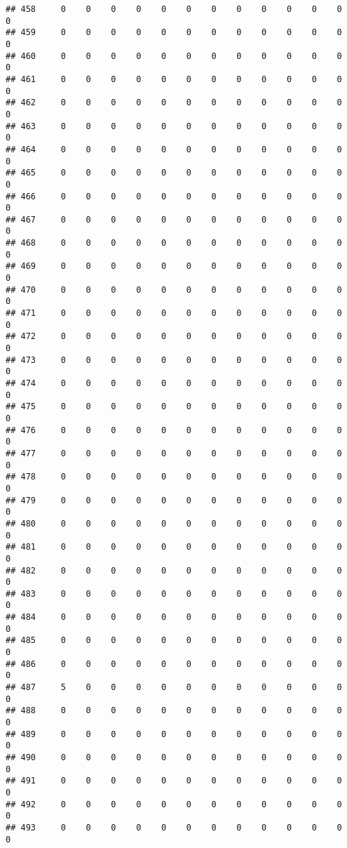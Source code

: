 \documentclass[]{article}
\begin{document}
\begin{verbatim}
## 458     0    0    0    0    0    0    0    0    0    0    0    0    0
## 459     0    0    0    0    0    0    0    0    0    0    0    0    0
## 460     0    0    0    0    0    0    0    0    0    0    0    0    0
## 461     0    0    0    0    0    0    0    0    0    0    0    0    0
## 462     0    0    0    0    0    0    0    0    0    0    0    0    0
## 463     0    0    0    0    0    0    0    0    0    0    0    0    0
## 464     0    0    0    0    0    0    0    0    0    0    0    0    0
## 465     0    0    0    0    0    0    0    0    0    0    0    0    0
## 466     0    0    0    0    0    0    0    0    0    0    0    0    0
## 467     0    0    0    0    0    0    0    0    0    0    0    0    0
## 468     0    0    0    0    0    0    0    0    0    0    0    0    0
## 469     0    0    0    0    0    0    0    0    0    0    0    0    0
## 470     0    0    0    0    0    0    0    0    0    0    0    0    0
## 471     0    0    0    0    0    0    0    0    0    0    0    0    0
## 472     0    0    0    0    0    0    0    0    0    0    0    0    0
## 473     0    0    0    0    0    0    0    0    0    0    0    0    0
## 474     0    0    0    0    0    0    0    0    0    0    0    0    0
## 475     0    0    0    0    0    0    0    0    0    0    0    0    0
## 476     0    0    0    0    0    0    0    0    0    0    0    0    0
## 477     0    0    0    0    0    0    0    0    0    0    0    0    0
## 478     0    0    0    0    0    0    0    0    0    0    0    0    0
## 479     0    0    0    0    0    0    0    0    0    0    0    0    0
## 480     0    0    0    0    0    0    0    0    0    0    0    0    0
## 481     0    0    0    0    0    0    0    0    0    0    0    0    0
## 482     0    0    0    0    0    0    0    0    0    0    0    0    0
## 483     0    0    0    0    0    0    0    0    0    0    0    0    0
## 484     0    0    0    0    0    0    0    0    0    0    0    0    0
## 485     0    0    0    0    0    0    0    0    0    0    0    0    0
## 486     0    0    0    0    0    0    0    0    0    0    0    0    0
## 487     5    0    0    0    0    0    0    0    0    0    0    0    0
## 488     0    0    0    0    0    0    0    0    0    0    0    0    0
## 489     0    0    0    0    0    0    0    0    0    0    0    0    0
## 490     0    0    0    0    0    0    0    0    0    0    0    0    0
## 491     0    0    0    0    0    0    0    0    0    0    0    0    0
## 492     0    0    0    0    0    0    0    0    0    0    0    0    0
## 493     0    0    0    0    0    0    0    0    0    0    0    0    0

\end{verbatim}
\end{document}
